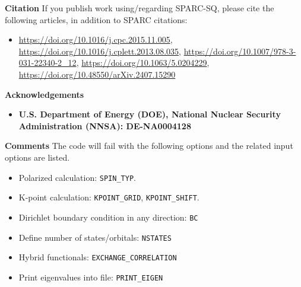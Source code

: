 \begin{frame}[allowframebreaks]{\textbf{Citation}} \label{Citation}
If you publish work using/regarding SPARC-SQ, please cite the following articles, in addition to SPARC citations:
\begin{itemize}
    \item \url{https://doi.org/10.1016/j.cpc.2015.11.005},
     \url{https://doi.org/10.1016/j.cplett.2013.08.035},
    \url{https://doi.org/10.1007/978-3-031-22340-2_12},
    \url{https://doi.org/10.1063/5.0204229},
    \url{https://doi.org/10.48550/arXiv.2407.15290}
\end{itemize}
\end{frame}

\begin{frame}[allowframebreaks]{\textbf{Acknowledgements}} \label{Acknowledgements}
\begin{itemize}
    \item \textbf{U.S. Department of Energy (DOE), National Nuclear Security Administration (NNSA): DE-NA0004128 
        } \\
\end{itemize}
\end{frame}


\begin{frame}[allowframebreaks]{\textbf{Comments}} \label{Introduction}
The code will fail with the following options and the related input options are listed.
\begin{itemize}
  \item Polarized calculation: \texttt{SPIN\_TYP}.
  \item K-point calculation: \texttt{KPOINT\_GRID}, \texttt{KPOINT\_SHIFT}.
  \item Dirichlet boundary condition in any direction: \texttt{BC}
  \item Define number of states/orbitals: \texttt{NSTATES}
  \item Hybrid functionals: \texttt{EXCHANGE\_CORRELATION}
  \item Print eigenvalues into file: \texttt{PRINT\_EIGEN}
\end{itemize}

\end{frame}

